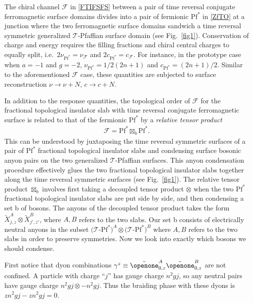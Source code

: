 The chiral channel $\mathcal{F}$ in \eqref{FTIFSFS} between a pair of time reversal conjugate ferromagnetic surface domains divides into a pair of fermionic $\mathrm{Pf}^\ast$ in \eqref{ZfTO} at a junction where the two ferromagnetic surface domains sandwich a time reversal symmetric generalized $\mathcal{T}$-Pfaffian surface domain (see Fig.~\ref{fig1}). Conservation of charge and energy requires the filling fractions and chiral central charges to equally split, i.e.~$2\nu_{\mathrm{Pf}^\ast}=\nu_{\mathcal{F}}$ and $2c_{\mathrm{Pf}^\ast}=c_{\mathcal{F}}$. For instance, in the prototype case when $a=-1$ and $g=-2$, $\nu_{\mathrm{Pf}^\ast}=1/2(2n+1)$ and $c_{\mathrm{Pf}^\ast}=(2n+1)/2$. Similar to the aforementioned $\mathcal{F}$ case, these quantities are subjected to surface reconstruction $\nu\to\nu+N$, $c\to c+N$. %

In addition to the response quantities, the topological order of $\mathcal{F}$ for the fractional topological insulator slab with time reversal conjugate ferromagnetic surface is related to that of the fermionic $\mathrm{Pf}^\ast$ by a {\em relative tensor product} \begin{align}\mathcal{F}=\mathrm{Pf}^\ast\boxtimes_b\mathrm{Pf}^\ast.\label{gluing}\end{align} This can be understood by juxtaposing the time reversal symmetric surfaces of a pair of $\mathrm{Pf}^\ast$ fractional topological insulator slabs and condensing surface bosonic anyon pairs on the two generalized $\mathcal{T}$-Pfaffian surfaces. This anyon condensation~\cite{BaisSlingerlandCondensation,Kong14,NeupertHeKeyserlingkSierraBernevig16} procedure effectively glues the two fractional topological insulator slabs together along the time reversal symmetric surfaces  (see Fig.~\ref{fig1}). The relative tensor product $\boxtimes_b$ involves first taking a decoupled tensor product $\otimes$ when the two $\mathrm{Pf}^\ast$ fractional topological insulator slabs are put side by side, and then condensing a set b of bosons. The anyons of the decoupled tensor product takes the form $\tilde{X}^A_{j,z}\otimes\tilde{X}^B_{j',z'}$, where $A,B$ refers to the two slabs. 
Our set b consists of electrically neutral anyons in the subset $(\mathcal{T}$-$\mathrm{Pf}^\ast)^A\otimes(\mathcal{T}$-$\mathrm{Pf}^\ast)^B$ where $A,B$ refers to the two slabs in order to preserve symmetries. Now we look into exactly which bosons we should condense.

First notice that dyon combinations $\gamma^z\equiv \tilde\openone^A_{0,z}\tilde\openone^B_{0,z}$ are not confined. A particle with charge ``$j$'' has gauge charge $n^2gj$, so any neutral pairs have gauge charge $n^2gj \otimes -n^2gj$. Thus the braiding phase with these dyons is $zn^2gj-zn^2gj = 0$.

